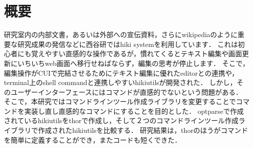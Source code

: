 \section{概要}
研究室内の内部文書，あるいは外部への宣伝資料，さらにwikipediaのように重要な研究成果の発信などに西谷研ではhiki systemを利用しています．
これは初心者にも覚えやすい直感的な操作であるが，慣れてくるとテキスト編集や画面更新にいちいちweb画面へ移行せねばならず，編集の思考が停止します．
そこで，編集操作がCUIで完結させるためにテキスト編集に優れたeditorとの連携や，terminal上のshell commandと連携しやすいhikiutilsが開発された．
しかし，そのユーザーインターフェースにはコマンドが直感的でないという問題がある．
そこで，本研究ではコマンドラインツール作成ライブラリを変更することでコマンドを実装し直し直感的なコマンドにすることを目的とした．
optparseで作成されているhikiutilsをthorで作成し，そして２つのコマンドラインツール作成ライブラリで作成されたhikiutilsを比較する．
研究結果は，thorのほうがコマンドを簡単に定義することができ，またコードも短くできた．

